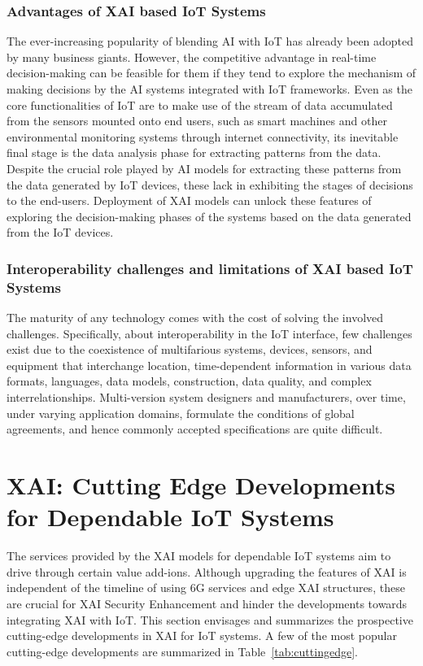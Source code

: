 \documentclass[journal]{IEEEtran}
\begin{document}
\subsubsection{Advantages of XAI based IoT Systems}
The ever-increasing popularity of blending AI with IoT has already been adopted by many business giants. However, the competitive advantage in real-time decision-making can be feasible for them if they tend to explore the mechanism of making decisions by the AI systems integrated with IoT frameworks. Even as the core functionalities of IoT are to make use of the stream of data accumulated from the sensors mounted onto end users, such as smart machines and other environmental monitoring systems through internet connectivity, its inevitable final stage is the data analysis phase for extracting patterns from the data. Despite the crucial role played by AI models for extracting these patterns from the data generated by IoT devices, these lack in exhibiting the stages of decisions to the end-users. Deployment of XAI models can unlock these features of exploring the decision-making phases of the systems based on the data generated from the IoT devices.

\subsubsection{Interoperability challenges and limitations of XAI based IoT Systems}
The maturity of any technology comes with the cost of solving the involved challenges. Specifically, about interoperability in the IoT interface, few challenges exist due to the coexistence of multifarious systems, devices, sensors, and equipment that interchange location, time-dependent information in various data formats, languages, data models, construction, data quality, and complex interrelationships. Multi-version system designers and manufacturers, over time, under varying application domains, formulate the conditions of global agreements, and hence commonly accepted specifications are quite difficult.

\section{XAI: Cutting Edge Developments for Dependable IoT Systems}
\label{sec:XAIforIoT}

The services provided by the XAI models for dependable IoT systems aim to drive through certain value add-ions. Although upgrading the features of XAI is independent of the timeline of using 6G services and edge XAI structures, these are crucial for XAI Security Enhancement and hinder the developments towards integrating XAI with IoT. This section envisages and summarizes the prospective cutting-edge developments in XAI for IoT systems. A few of the most popular cutting-edge developments are summarized in Table~\ref{tab:cuttingedge}.
\end{document}
